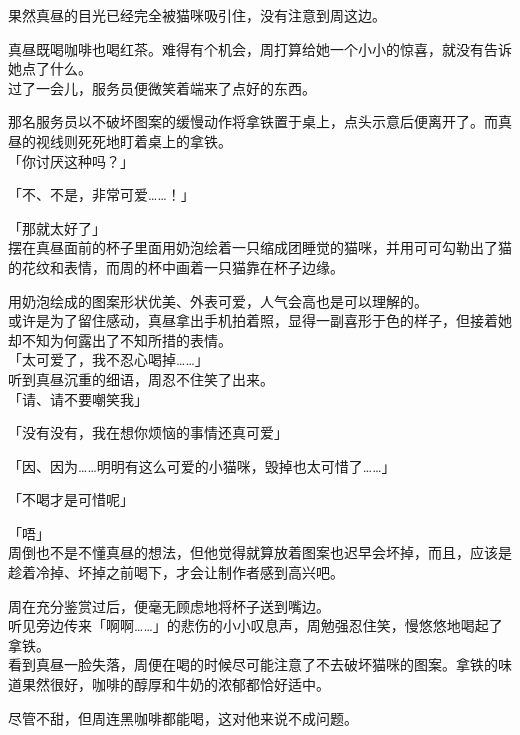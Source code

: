 果然真昼的目光已经完全被猫咪吸引住，没有注意到周这边。

真昼既喝咖啡也喝红茶。难得有个机会，周打算给她一个小小的惊喜，就没有告诉她点了什么。\\

过了一会儿，服务员便微笑着端来了点好的东西。

那名服务员以不破坏图案的缓慢动作将拿铁置于桌上，点头示意后便离开了。而真昼的视线则死死地盯着桌上的拿铁。\\

「你讨厌这种吗？」

「不、不是，非常可爱……！」

「那就太好了」\\

摆在真昼面前的杯子里面用奶泡绘着一只缩成团睡觉的猫咪，并用可可勾勒出了猫的花纹和表情，而周的杯中画着一只猫靠在杯子边缘。

用奶泡绘成的图案形状优美、外表可爱，人气会高也是可以理解的。\\

或许是为了留住感动，真昼拿出手机拍着照，显得一副喜形于色的样子，但接着她却不知为何露出了不知所措的表情。\\

「太可爱了，我不忍心喝掉……」\\

听到真昼沉重的细语，周忍不住笑了出来。\\

「请、请不要嘲笑我」

「没有没有，我在想你烦恼的事情还真可爱」

「因、因为……明明有这么可爱的小猫咪，毁掉也太可惜了……」

「不喝才是可惜呢」

「唔」\\

周倒也不是不懂真昼的想法，但他觉得就算放着图案也迟早会坏掉，而且，应该是趁着冷掉、坏掉之前喝下，才会让制作者感到高兴吧。

周在充分鉴赏过后，便毫无顾虑地将杯子送到嘴边。\\

听见旁边传来「啊啊……」的悲伤的小小叹息声，周勉强忍住笑，慢悠悠地喝起了拿铁。\\

看到真昼一脸失落，周便在喝的时候尽可能注意了不去破坏猫咪的图案。拿铁的味道果然很好，咖啡的醇厚和牛奶的浓郁都恰好适中。

尽管不甜，但周连黑咖啡都能喝，这对他来说不成问题。\\

